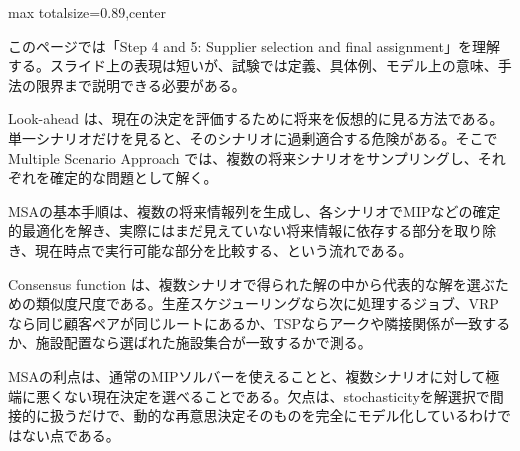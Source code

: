 \begin{minipage}[t]{0.58\textwidth}
\begin{adjustbox}{max totalsize={\textwidth}{0.89\textheight},center}
\begin{minipage}{\textwidth}\scriptsize
{}このページでは「Step 4 and 5: Supplier selection and final assignment」を理解する。スライド上の表現は短いが、試験では定義、具体例、モデル上の意味、手法の限界まで説明できる必要がある。\par
Look-ahead は、現在の決定を評価するために将来を仮想的に見る方法である。単一シナリオだけを見ると、そのシナリオに過剰適合する危険がある。そこで Multiple Scenario Approach では、複数の将来シナリオをサンプリングし、それぞれを確定的な問題として解く。\par
MSAの基本手順は、複数の将来情報列を生成し、各シナリオでMIPなどの確定的最適化を解き、実際にはまだ見えていない将来情報に依存する部分を取り除き、現在時点で実行可能な部分を比較する、という流れである。\par
Consensus function は、複数シナリオで得られた解の中から代表的な解を選ぶための類似度尺度である。生産スケジューリングなら次に処理するジョブ、VRPなら同じ顧客ペアが同じルートにあるか、TSPならアークや隣接関係が一致するか、施設配置なら選ばれた施設集合が一致するかで測る。\par
MSAの利点は、通常のMIPソルバーを使えることと、複数シナリオに対して極端に悪くない現在決定を選べることである。欠点は、stochasticityを解選択で間接的に扱うだけで、動的な再意思決定そのものを完全にモデル化しているわけではない点である。\par

\end{minipage}
\end{adjustbox}
\end{minipage}
